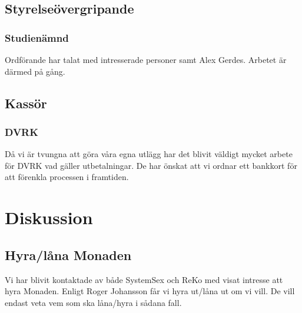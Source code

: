 \documentclass[protokoll]{dvd}
\begin{document}
\subsection{Styrelseövergripande}
    \subsubsection{Studienämnd}
    Ordförande har talat med intresserade personer samt Alex Gerdes. Arbetet är därmed på gång.

\newpage

\subsection{Kassör}
    \subsubsection{DVRK}
    Då vi är tvungna att göra våra egna utlägg har det blivit väldigt
    mycket arbete för DVRK vad gäller utbetalningar.
    De har önskat att vi ordnar ett bankkort för att förenkla processen i framtiden.



\section{Diskussion}

    \subsection{Hyra/låna Monaden}
    Vi har blivit kontaktade av både SystemSex och ReKo med visat intresse att hyra Monaden.
    Enligt Roger Johansson får vi hyra ut/låna ut om vi vill.
    De vill endast veta vem som ska låna/hyra i sådana fall.
\end{document}
